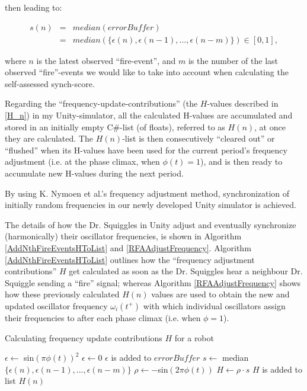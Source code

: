 	then leading to:
	
	\begin{equation}
	\label{self_assessed_synch}
		\begin{array}{rrclcl}
		s(n) & = & median(errorBuffer) \\ 
		& = & median(\{\epsilon(n), \epsilon(n-1), ... , \epsilon(n-m)\}) \in [0, 1],
		\end{array}
	\end{equation} \nl
	
	where $n$ is the latest observed ``fire-event'', and $m$ is the number of the last observed ``fire''-events we would like to take into account when calculating the self-assessed synch-score. \nl
	
	Regarding the ``frequency-update-contributions'' (the $H$-values described in \ref{H_n}) in my Unity-simulator, all the calculated H-values are accumulated and stored in an initially empty C\#-list (of floats), referred to as $H(n)$, at once they are calculated. The $H(n)$-list is then consecutively ``cleared out'' or ``flushed'' when its H-values have been used for the current period's frequency adjustment (i.e. at the phase climax, when $\phi(t)=1$), and is then ready to accumulate new H-values during the next period.
	
	By using K. Nymoen et al.'s frequency adjustment method, synchronization of initially random frequencies in our newly developed Unity simulator is achieved.
	
	The details of how the Dr. Squiggles in Unity adjust and eventually synchronize (harmonically) their oscillator frequencies, is shown in Algorithm \ref{AddNthFireEventsHToList} and \ref{RFAAdjustFrequency}. Algorithm \ref{AddNthFireEventsHToList} outlines how the ``frequency adjustment contributions'' $H$ get calculated as soon as the Dr. Squiggles hear a neighbour Dr. Squiggle sending a ``fire'' signal; whereas Algorithm \ref{RFAAdjustFrequency} shows how these previously calculated $H(n)$ values are used to obtain the new and updated oscillator frequency $\omega_i(t^+)$ with which individual oscillators assign their frequencies to after each phase climax (i.e. when $\phi=1$).
	
	\begin{algorithm}
	\caption{Calculating frequency update contributions $H$ for a robot}\label{AddNthFireEventsHToList}
	\begin{algorithmic}[1]
			\State $\epsilon \gets$ sin$(\pi \phi(t))^2$  %
		\Else
			\State $\epsilon \gets 0$
		\EndIf
		\State $\epsilon$ is added to $errorBuffer$
		\State $s \gets$ median$\{\epsilon(n), \epsilon(n-1), ..., \epsilon(n-m)\}$ 
		\State $\rho \gets -$sin$(2\pi\phi(t))$ 
		\State $H \gets \rho \cdot s $ 
		\State $H$ is added to list $H(n)$
	\EndProcedure
	\end{algorithmic}
	\end{algorithm}
	
